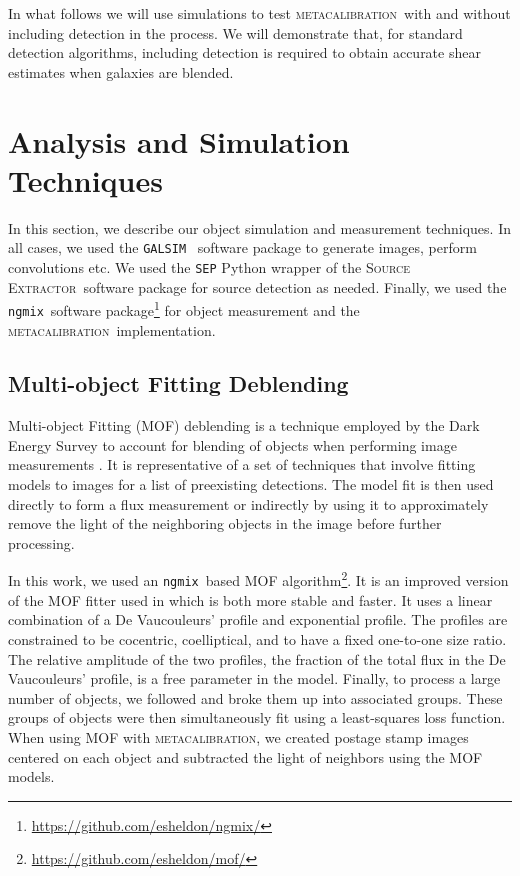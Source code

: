 \documentclass[iop, twocolappendix, appendixfloats, numberedappendix, apj]{hackemulateapj}
\newcommand{\galsim}{\texttt{GALSIM}}
\newcommand{\ngmix}{\texttt{ngmix}}
\newcommand{\mcal}{\textsc{metacalibration}}
\newcommand{\sx}{\textsc{Source Extractor}}
\begin{document}
In what follows we will use simulations to test \mcal\ with and without
including detection in the process.  We will demonstrate that, for standard
detection algorithms, including detection is required to obtain accurate shear
estimates when galaxies are blended.

\section{Analysis and Simulation Techniques}
\label{sec:sims}

In this section, we describe our object simulation and measurement techniques.
In all cases, we used the \galsim\ \citep{GALSIM2015} software package to
generate images, perform convolutions etc. We used the \texttt{SEP} \citep{sep}
Python wrapper of the \sx\ software package \citep{Bertin96} for source
detection as needed. Finally, we used the \ngmix\ software
package\footnote{\url{https://github.com/esheldon/ngmix/}} for object
measurement and the \mcal\ implementation.

\subsection{Multi-object Fitting Deblending} \label{sec:mof}

Multi-object Fitting (MOF) deblending is a technique employed by the Dark
Energy Survey to account for blending of objects when performing image
measurements \citep{DESY1cat}. It is representative of a set of techniques that
involve fitting models to images for a list of preexisting detections. The
model fit is then used directly to form a flux measurement or indirectly by
using it to approximately remove the light of the neighboring objects in the
image before further processing.

In this work, we used an \ngmix\ based MOF
algorithm\footnote{\url{https://github.com/esheldon/mof/}}. It is an improved
version of the MOF fitter used in \cite{DESY1cat} which is both more stable and
faster. It uses a linear combination of a De Vaucouleurs' \citep{devauc1948}
profile and exponential profile. The profiles are constrained to be cocentric,
coelliptical, and to have a fixed one-to-one size ratio.  The relative
amplitude of the two profiles, the fraction of the total flux in the De
Vaucouleurs' profile, is a free parameter in the model. Finally, to process a
large number of objects, we followed \citet{DESY1cat} and broke them up into
associated groups.  These groups of objects were then simultaneously fit using
a least-squares loss function.  When using MOF with \mcal, we created postage
stamp images centered on each object and subtracted the light of neighbors
using the MOF models.
\end{document}
